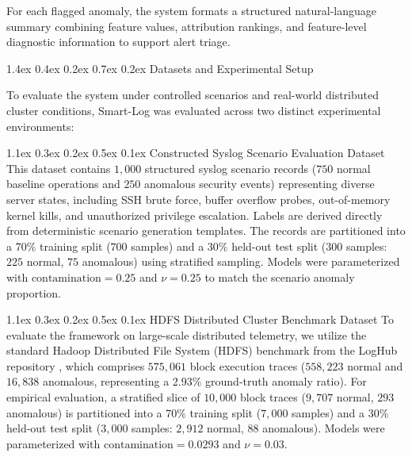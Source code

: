 \documentclass[10pt,conference]{IEEEtran}
\makeatletter
\renewcommand\section{\@startsection{section}{1}{\z@}%
  {1.4ex \@plus 0.4ex \@minus 0.2ex}%
  {0.7ex \@plus 0.2ex}%
  {\normalfont\fontsize{12pt}{14.4pt}\selectfont\bfseries\centering}}
\renewcommand\subsection{\@startsection{subsection}{2}{\z@}%
  {1.1ex \@plus 0.3ex \@minus 0.2ex}%
  {0.5ex \@plus 0.1ex}%
  {\normalfont\fontsize{12pt}{14.4pt}\selectfont\bfseries}}
\makeatother
\begin{document}
For each flagged anomaly, the system formats a structured natural-language summary combining feature values, attribution rankings, and feature-level diagnostic information to support alert triage.

\section{Datasets and Experimental Setup}
\label{sec:dataset_setup}

To evaluate the system under controlled scenarios and real-world distributed cluster conditions, Smart-Log was evaluated across two distinct experimental environments:

\subsection{Constructed Syslog Scenario Evaluation Dataset}
This dataset contains $1,000$ structured syslog scenario records ($750$ normal baseline operations and $250$ anomalous security events) representing diverse server states, including SSH brute force, buffer overflow probes, out-of-memory kernel kills, and unauthorized privilege escalation. Labels are derived directly from deterministic scenario generation templates. The records are partitioned into a 70\% training split ($700$ samples) and a 30\% held-out test split ($300$ samples: $225$ normal, $75$ anomalous) using stratified sampling. Models were parameterized with $\text{contamination} = 0.25$ and $\nu = 0.25$ to match the scenario anomaly proportion.

\subsection{HDFS Distributed Cluster Benchmark Dataset}
To evaluate the framework on large-scale distributed telemetry, we utilize the standard Hadoop Distributed File System (HDFS) benchmark from the LogHub repository \cite{b9, b10}, which comprises $575,061$ block execution traces ($558,223$ normal and $16,838$ anomalous, representing a 2.93\% ground-truth anomaly ratio). For empirical evaluation, a stratified slice of $10,000$ block traces ($9,707$ normal, $293$ anomalous) is partitioned into a 70\% training split ($7,000$ samples) and a 30\% held-out test split ($3,000$ samples: $2,912$ normal, $88$ anomalous). Models were parameterized with $\text{contamination} = 0.0293$ and $\nu = 0.03$.
\end{document}
